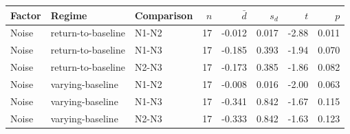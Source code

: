 \begin{tabular}{lllrrrrr}
\toprule
Factor & Regime & Comparison & \(n\) & \(\bar{d}\) & \(s_d\) & \(t\) & \(p\) \\
\midrule
Noise & return-to-baseline & N1-N2 & 17 & -0.012 & 0.017 & -2.88 & 0.011 \\
Noise & return-to-baseline & N1-N3 & 17 & -0.185 & 0.393 & -1.94 & 0.070 \\
Noise & return-to-baseline & N2-N3 & 17 & -0.173 & 0.385 & -1.86 & 0.082 \\
Noise & varying-baseline & N1-N2 & 17 & -0.008 & 0.016 & -2.00 & 0.063 \\
Noise & varying-baseline & N1-N3 & 17 & -0.341 & 0.842 & -1.67 & 0.115 \\
Noise & varying-baseline & N2-N3 & 17 & -0.333 & 0.842 & -1.63 & 0.123 \\
\bottomrule
\end{tabular}
